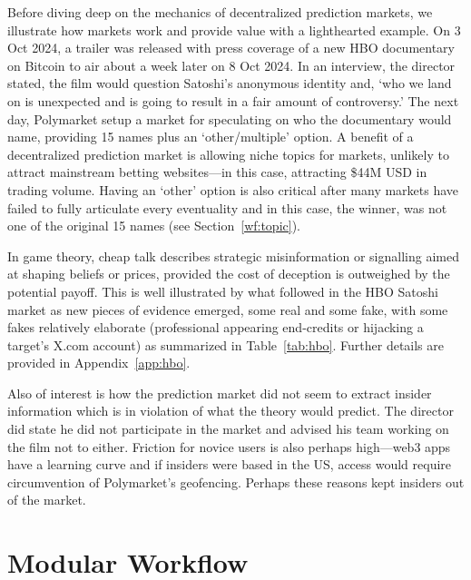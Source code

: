 Before diving deep on the mechanics of decentralized prediction markets, we illustrate how markets work and provide value with a lighthearted example. On 3 Oct 2024, a trailer was released with press coverage of a new HBO documentary on Bitcoin to air about a week later on 8 Oct 2024. In an interview, the director stated, the film would question Satoshi's anonymous identity and, `who we land on is unexpected and is going to result in a fair amount of controversy.' The next day, Polymarket setup a market for speculating on who the documentary would name, providing 15 names plus an `other/multiple' option. A benefit of a decentralized prediction market is allowing niche topics for markets, unlikely to attract mainstream betting websites---in this case, attracting \$44M USD in trading volume. Having an `other' option is also critical after many markets have failed to fully articulate every eventuality and in this case, the winner, was not one of the original 15 names (see Section~\ref{wf:topic}).

In game theory, cheap talk describes strategic misinformation or signalling aimed at shaping beliefs or prices, provided the cost of deception is outweighed by the potential payoff. This is well illustrated by what followed in the HBO Satoshi market as new pieces of evidence emerged, some real and some fake, with some fakes relatively elaborate (professional appearing end-credits or hijacking a target's X.com account) as summarized in Table~\ref{tab:hbo}. Further details are provided in Appendix~\ref{app:hbo}.

Also of interest is how the prediction market did not seem to extract insider information which is in violation of what the theory would predict. The director did state he did not participate in the market and advised his team working on the film not to either. Friction for novice users is also perhaps high---web3 apps have a learning curve and if insiders were based in the US, access would require circumvention of Polymarket's geofencing. Perhaps these reasons kept insiders out of the market.


\section{Modular Workflow}

